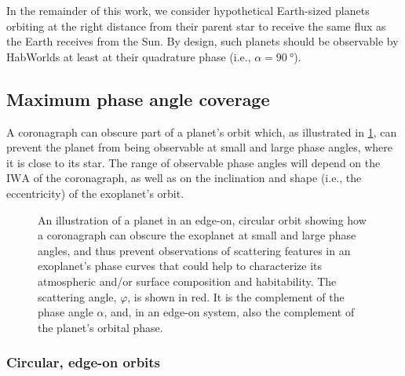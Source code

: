 \documentclass[usenatbib]{mnras}
\newcommand{\IWA}{\ensuremath{\mathrm{IWA}}\xspace}
\newcommand{\HWO}{HabWorlds\xspace}
\begin{document}
In the remainder of this work, we consider hypothetical Earth-sized planets orbiting at the right distance from their parent star to receive the same flux as the Earth receives from the Sun.
By design, such planets should be observable by \HWO at least at their quadrature phase (i.e., $\alpha=\qty{90}{\degree}$).



\subsection{Maximum phase angle coverage}
\label{subsec:2.2}

A coronagraph can obscure part of a planet's orbit which, as illustrated in \cref{fig:annotated-orbit}, can prevent the planet from being observable at small and large phase angles, where it is close to its star. 
The range of observable phase angles will depend on the \IWA of the coronagraph, as well as on the inclination and shape (i.e., the eccentricity) of the exoplanet's orbit.


\begin{figure}
    \centering
    
    \caption{
        An illustration of a planet in an edge-on, circular orbit showing how a coronagraph can obscure the exoplanet at small and large phase angles, and thus prevent observations of scattering features in an exoplanet's phase curves that could help to characterize its atmospheric and/or surface composition and habitability. 
        The scattering angle, $\varphi$, is shown in red. 
        It is the complement of the phase angle $\alpha$, and, in an edge-on system, also the complement of the planet's orbital phase.
    }
    \label{fig:annotated-orbit}
\end{figure}

\subsubsection{Circular, edge-on orbits}
\end{document}
